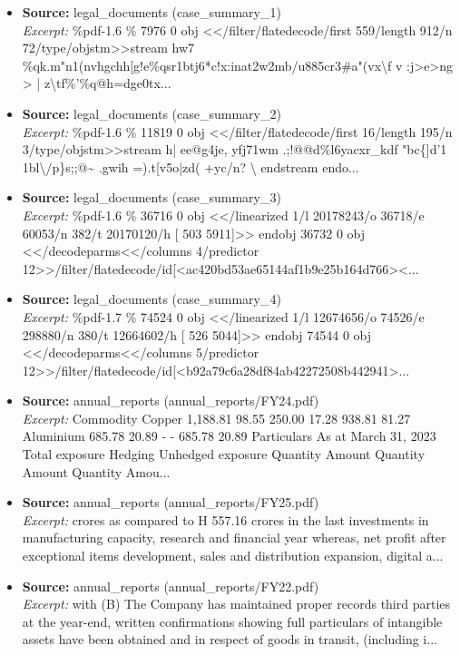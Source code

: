 \documentclass[11pt,a4paper]{article}
\begin{document}
\begin{itemize}
\item \textbf{Source:} legal\_documents (case\_summary\_1) \\ \textit{Excerpt:} \%pdf-1.6 \% 7976 0 obj <</filter/flatedecode/first 559/length 912/n 72/type/objstm>>stream hw7 \%qk.m"n1(nvhgchh[g!e\%qsr1btj6*c!x:inat2w2mb/u885cr3\#a"(vx\textbackslash{}f v :j>e>ng > | z\textbackslash{}tf\%'\%q@h=dge0tx...
\item \textbf{Source:} legal\_documents (case\_summary\_2) \\ \textit{Excerpt:} \%pdf-1.6 \% 11819 0 obj <</filter/flatedecode/first 16/length 195/n 3/type/objstm>>stream h| ee@g4je, yfj71wm .;!@@d\%l6yacxr\_kdf "bc\{]d'1 1bl\textbackslash{}/p\}s;;@\textasciitilde{} .gwih =).t[v5o|zd( +yc/n? \textbackslash{} endstream endo...
\item \textbf{Source:} legal\_documents (case\_summary\_3) \\ \textit{Excerpt:} \%pdf-1.6 \% 36716 0 obj <</linearized 1/l 20178243/o 36718/e 60053/n 382/t 20170120/h [ 503 5911]>> endobj 36732 0 obj <</decodeparms<</columns 4/predictor 12>>/filter/flatedecode/id[<ac420bd53ae65144af1b9e25b164d766><...
\item \textbf{Source:} legal\_documents (case\_summary\_4) \\ \textit{Excerpt:} \%pdf-1.7 \% 74524 0 obj <</linearized 1/l 12674656/o 74526/e 298880/n 380/t 12664602/h [ 526 5044]>> endobj 74544 0 obj <</decodeparms<</columns 5/predictor 12>>/filter/flatedecode/id[<b92a79c6a28df84ab42272508b442941>...
\item \textbf{Source:} annual\_reports (annual\_reports/FY24.pdf) \\ \textit{Excerpt:} Commodity Copper 1,188.81 98.55 250.00 17.28 938.81 81.27 Aluminium 685.78 20.89 - - 685.78 20.89 Particulars As at March 31, 2023 Total exposure Hedging Unhedged exposure Quantity Amount Quantity Amount Quantity Amou...
\item \textbf{Source:} annual\_reports (annual\_reports/FY25.pdf) \\ \textit{Excerpt:} crores as compared to H 557.16 crores in the last investments in manufacturing capacity, research and financial year whereas, net profit after exceptional items development, sales and distribution expansion, digital a...
\item \textbf{Source:} annual\_reports (annual\_reports/FY22.pdf) \\ \textit{Excerpt:} with (B) The Company has maintained proper records third parties at the year-end, written confirmations showing full particulars of intangible assets have been obtained and in respect of goods in transit, (including i...
\end{itemize}
\end{document}
